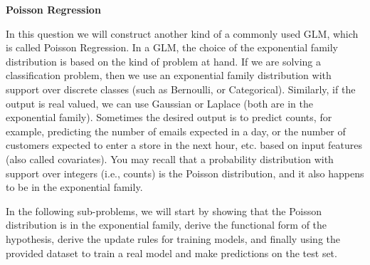 \item {} {\bf Poisson Regression}

In this question we will construct another kind of a commonly used GLM, which is called Poisson Regression. In a GLM, the choice of the exponential family distribution is based on the kind of problem at hand. If we are solving a classification problem, then we use an exponential family distribution with support over discrete classes (such as Bernoulli, or Categorical). Similarly, if the output is real valued, we can use Gaussian or Laplace (both are in the exponential family). Sometimes the desired output is to predict counts, for example, predicting the number of emails expected in a day, or the number of customers expected to enter a store in the next hour, etc. based on input features (also called covariates). You may recall that a probability distribution with support over integers (i.e., counts) is the Poisson distribution, and it also happens to be in the exponential family.

In the following sub-problems, we will start by showing that the Poisson distribution is in the exponential family, derive the functional form of the hypothesis, derive the update rules for training models, and finally using the provided dataset to train a real model and make predictions on the test set.

\begin{enumerate}
	

\ifnum{}\fi

	


\ifnum{}\fi

	


\ifnum{}\fi

	


\ifnum{} {
  
} \fi

\end{enumerate}
